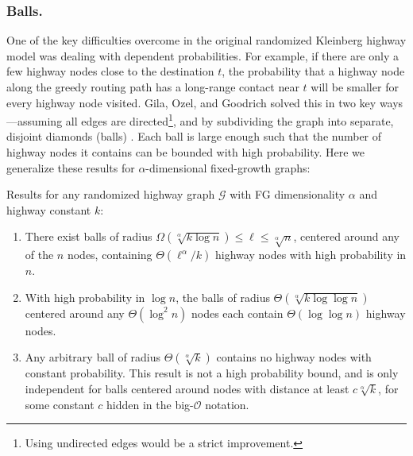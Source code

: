 \subsubsection{Balls.}
%
One of the key difficulties overcome in the original randomized Kleinberg
highway model was dealing with dependent probabilities.
For example, if there are only a few highway nodes close to the destination $t$, the probability that
a highway node along the greedy routing path has a long-range contact near $t$ will
be smaller for every highway node visited.
Gila, Ozel, and Goodrich solved this in two key ways---assuming all edges are
directed\footnote{Using undirected edges would be a strict improvement.}, and by
subdividing the graph into separate, disjoint diamonds (balls) \cite{gila2023highway}.
Each ball is large enough such that the number of highway nodes it contains can
be bounded with high probability.
Here we generalize these results for $\alpha$-dimensional fixed-growth graphs:
%
\begin{lemma} \label{lem:balls}
    Results for any randomized highway graph $\mathcal{G}$ with FG dimensionality $\alpha$ and highway constant $k$:
    \begin{enumerate}
        \item There exist balls of radius $\Omega(\sqrt[\alpha]{k \log{n}}) \leq
        \ell \leq \sqrt[\alpha]{n}$, centered around any of the $n$ nodes,
        containing $\Theta(\ell^\alpha / k)$ highway nodes with high probability in
        $n$. \label{lem:balls:always}


        \item With high probability in
        $\log{n}$, the balls of radius $\Theta(\sqrt[\alpha]{k
        \log{\log{n}}})$ centered around any $\Theta(\log^2{n})$ nodes each contain
        $\Theta(\log{\log{n}})$ highway nodes. \label{lem:balls:log}
        
        \item Any arbitrary ball of radius $\Theta(\sqrt[\alpha]{k})$ contains
        no highway nodes with constant probability.
        This result is not a high probability bound, and is only independent for
        balls centered around nodes with distance at least $c \sqrt[\alpha]{k}$,
        for some constant $c$ hidden in the big-$\mathcal{O}$ notation.
        \label{lem:balls:constant}
    \end{enumerate}
\end{lemma}

